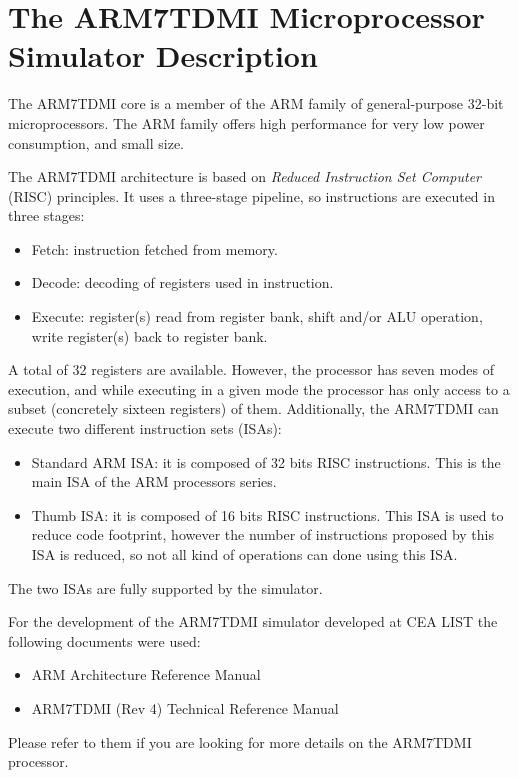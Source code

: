 \section{The ARM7TDMI Microprocessor Simulator Description}

The ARM7TDMI core is a member of the ARM family of general-purpose 32-bit microprocessors.
The ARM family offers high performance for very low power consumption, and small size.

The ARM7TDMI architecture is based on \emph{Reduced Instruction Set Computer} (RISC) principles.
It uses a three-stage pipeline, so instructions are executed in three stages:
\begin{itemize}
	\item Fetch: instruction fetched from memory.
	\item Decode: decoding of registers used in instruction.
	\item Execute: register(s) read from register bank, shift and/or ALU operation, write register(s) back to register bank.
\end{itemize}
A total of 32 registers are available.
However, the processor has seven modes of execution, and while executing in a given mode the processor has only access to a subset (concretely sixteen registers) of them.
Additionally, the ARM7TDMI can execute two different instruction sets (ISAs):
\begin{itemize}
	\item Standard ARM ISA: it is composed of 32 bits RISC instructions. This is the main ISA of the ARM processors series.
	\item Thumb ISA: it is composed of 16 bits RISC instructions. This ISA is used to reduce code footprint, however the number of instructions proposed by this ISA is reduced, so not all kind of operations can done using this ISA.
\end{itemize}
The two ISAs are fully supported by the simulator.

For the development of the ARM7TDMI simulator developed at CEA LIST the following documents were used:
\begin{itemize}
	\item ARM Architecture Reference Manual
	\item ARM7TDMI (Rev 4) Technical Reference Manual
\end{itemize}
Please refer to them if you are looking for more details on the ARM7TDMI processor.

